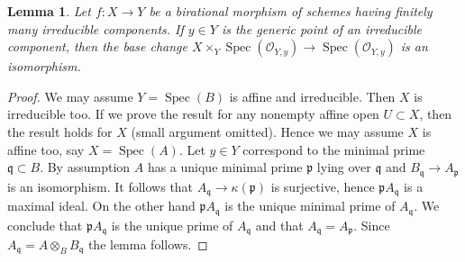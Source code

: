 \documentclass[10pt,a4paper]{amsart}
\theoremstyle{plain}
\newtheorem{lemma}[subsection]{Lemma}
\theoremstyle{definition}
\theoremstyle{remark}
\numberwithin{equation}{subsection}
\def\Spec{\mathop{\mathrm{Spec}}}
\begin{document}
\begin{lemma}
\label{lemma-birational-generic-fibres}
Let $f : X \to Y$ be a birational morphism of schemes having finitely
many irreducible components. If $y \in Y$ is the generic point of
an irreducible component, then the base change
$X \times_Y \Spec(\mathcal{O}_{Y, y}) \to \Spec(\mathcal{O}_{Y, y})$
is an isomorphism.
\end{lemma}

\begin{proof}
We may assume $Y = \Spec(B)$ is affine and irreducible.
Then $X$ is irreducible too. If we prove the result for any nonempty
affine open $U \subset X$, then the result holds for $X$
(small argument omitted). Hence we may assume $X$
is affine too, say $X = \Spec(A)$.
Let $y \in Y$ correspond to the minimal prime $\mathfrak q \subset B$.
By assumption $A$ has a unique minimal prime $\mathfrak p$ lying
over $\mathfrak q$ and $B_\mathfrak q \to A_\mathfrak p$ is an isomorphism.
It follows that $A_\mathfrak q \to \kappa(\mathfrak p)$ is surjective,
hence $\mathfrak p A_\mathfrak q$ is a maximal ideal. On the other hand
$\mathfrak p A_\mathfrak q$ is the unique minimal prime of $A_\mathfrak q$.
We conclude that $\mathfrak p A_\mathfrak q$ is the unique prime of
$A_\mathfrak q$ and that $A_\mathfrak q = A_\mathfrak p$. Since
$A_\mathfrak q = A \otimes_B B_\mathfrak q$ the lemma follows.
\end{proof}
\end{document}

